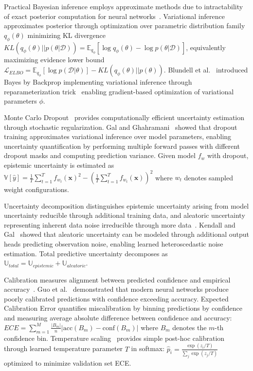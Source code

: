 Practical Bayesian inference employs approximate methods due to intractability of exact posterior computation for neural networks~\cite{mackay1992practical}. Variational inference~\cite{jordan1999introduction,ranganath2014black} approximates posterior through optimization over parametric distribution family $q_\phi(\theta)$ minimizing KL divergence $KL(q_\phi(\theta)||p(\theta|\mathcal{D})) = \mathbb{E}_{q_\phi}[\log q_\phi(\theta) - \log p(\theta|\mathcal{D})]$, equivalently maximizing evidence lower bound $\mathcal{L}_{ELBO} = \mathbb{E}_{q_\phi}[\log p(\mathcal{D}|\theta)] - KL(q_\phi(\theta)||p(\theta))$. Blundell et al.~\cite{blundell2015weight} introduced Bayes by Backprop implementing variational inference through reparameterization trick~\cite{kingma2014auto} enabling gradient-based optimization of variational parameters $\phi$.

Monte Carlo Dropout~\cite{gal2016dropout,srivastava2014dropout} provides computationally efficient uncertainty estimation through stochastic regularization. Gal and Ghahramani~\cite{gal2016dropout} showed that dropout training approximates variational inference over model parameters, enabling uncertainty quantification by performing multiple forward passes with different dropout masks and computing prediction variance. Given model $f_w$ with dropout, epistemic uncertainty is estimated as $\mathbb{V}[\hat{y}] = \frac{1}{T}\sum_{t=1}^T f_{w_t}(\mathbf{x})^2 - (\frac{1}{T}\sum_{t=1}^T f_{w_t}(\mathbf{x}))^2$ where $w_t$ denotes sampled weight configurations.

Uncertainty decomposition distinguishes epistemic uncertainty arising from model uncertainty reducible through additional training data, and aleatoric uncertainty representing inherent data noise irreducible through more data~\cite{der2009aleatory}. Kendall and Gal~\cite{kendall2017uncertainties} showed that aleatoric uncertainty can be modeled through additional output heads predicting observation noise, enabling learned heteroscedastic noise estimation. Total predictive uncertainty decomposes as $\mathbb{U}_{total} = \mathbb{U}_{epistemic} + \mathbb{U}_{aleatoric}$.

Calibration measures alignment between predicted confidence and empirical accuracy~\cite{naeini2015obtaining}. Guo et al.~\cite{guo2017calibration} demonstrated that modern neural networks produce poorly calibrated predictions with confidence exceeding accuracy. Expected Calibration Error quantifies miscalibration by binning predictions by confidence and measuring average absolute difference between confidence and accuracy: $ECE = \sum_{m=1}^M \frac{|B_m|}{n}|\text{acc}(B_m) - \text{conf}(B_m)|$ where $B_m$ denotes the $m$-th confidence bin. Temperature scaling~\cite{guo2017calibration,platt1999probabilistic} provides simple post-hoc calibration through learned temperature parameter $T$ in softmax: $\hat{p}_i = \frac{\exp(z_i/T)}{\sum_j \exp(z_j/T)}$ optimized to minimize validation set ECE.

